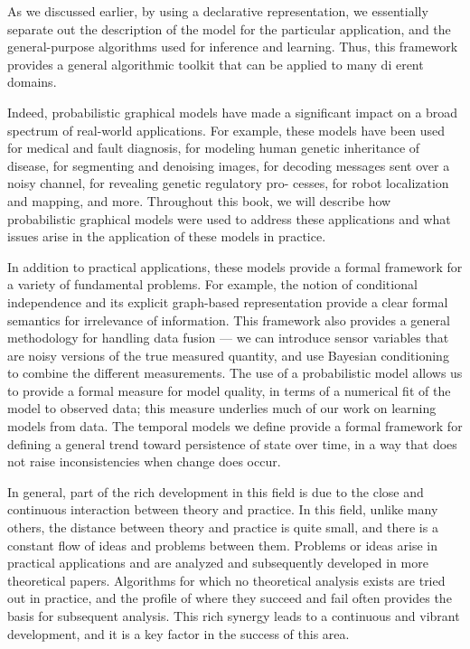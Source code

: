 \documentclass{article}
\theoremstyle{definition}
\theoremstyle{remark}
\theoremstyle{definition}
\begin{document}
\begin{CJK*}{UTF8}{gbsn}
As we discussed earlier, by using a declarative representation, we essentially separate out the description of the model for the particular application, and the general-purpose algorithms used for inference and learning. Thus, this framework provides a general algorithmic toolkit that can be applied to many di erent domains.

Indeed, probabilistic graphical models have made a significant impact on a broad spectrum of real-world applications. For example, these models have been used for medical and fault diagnosis, for modeling human genetic inheritance of disease, for segmenting and denoising images, for decoding messages sent over a noisy channel, for revealing genetic regulatory pro- cesses, for robot localization and mapping, and more. Throughout this book, we will describe how probabilistic graphical models were used to address these applications and what issues arise in the application of these models in practice.

In addition to practical applications, these models provide a formal framework for a variety of fundamental problems. For example, the notion of conditional independence and its explicit graph-based representation provide a clear formal semantics for irrelevance of information. This framework also provides a general methodology for handling data fusion — we can introduce sensor variables that are noisy versions of the true measured quantity, and use Bayesian conditioning to combine the different measurements. The use of a probabilistic model allows us to provide a formal measure for model quality, in terms of a numerical fit of the model to observed data; this measure underlies much of our work on learning models from data. The temporal models we define provide a formal framework for defining a general trend toward persistence of state over time, in a way that does not raise inconsistencies when change does occur.

In general, part of the rich development in this field is due to the close and continuous interaction between theory and practice. In this field, unlike many others, the distance between theory and practice is quite small, and there is a constant flow of ideas and problems between them. Problems or ideas arise in practical applications and are analyzed and subsequently developed in more theoretical papers. Algorithms for which no theoretical analysis exists are tried out in practice, and the profile of where they succeed and fail often provides the basis for subsequent analysis. This rich synergy leads to a continuous and vibrant development, and it is a key factor in the success of this area.






\end{CJK*}
\end{document}
